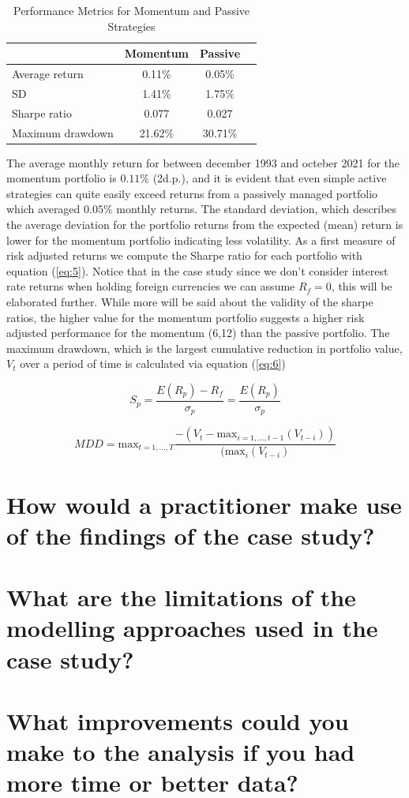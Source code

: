 \documentclass{article}
\begin{document}
\begin{table}
    \centering
    
    \caption{Performance Metrics for Momentum and Passive Strategies}
    \label{table:performance}
    \begin{tabular}{lccc}
        \toprule
        & \textbf{Momentum} & \textbf{Passive} \\
        \midrule
        Average return & 0.11\% & 0.05\% \\
        SD & 1.41\% & 1.75\% \\
        Sharpe ratio & 0.077 & 0.027 \\
        Maximum drawdown & 21.62\% & 30.71\% \\
        \bottomrule
    \end{tabular}
\end{table}

The average monthly return for between december 1993 and octeber 2021 for the momentum portfolio is $0.11\%$ (2d.p.), and it is evident that even simple active strategies can quite easily exceed returns from a passively managed portfolio which averaged $0.05\%$ monthly returns. The standard deviation, which describes the average deviation for the portfolio returns from the expected (mean) return is lower for the momentum portfolio indicating less volatility. As a first measure of risk adjusted returns we compute the Sharpe ratio for each portfolio with equation (\ref{eq:5}). Notice that in the case study since we don't consider interest rate returns when holding foreign currencies we can assume $R_{f} = 0$, this will be elaborated further.  While more will be said about the validity of the sharpe ratios, the higher value for the momentum portfolio suggests a higher risk adjusted performance for the momentum (6,12) than the passive portfolio. The maximum drawdown, which is the largest cumulative reduction in portfolio value, $V_{t}$ over a period of time is calculated via equation (\ref{eq:6})

\begin{equation}\label{eq:5}
    S_{p}=\frac{E(R_{p})-R_{f}}{\sigma_{p}}=\frac{E(R_{p})}{\sigma_{p}}
\end{equation}

\begin{equation}\label{eq:6}
        MDD = \text{max}_{t=1,...,T}\frac{-(V_{t}-\text{max}_{i=1,...,t-1}(V_{t-i}))}{(\text{max}_{i}(V_{t-i})}
\end{equation}


\newpage\section*{How would a practitioner make use of the findings of the case study?}

\newpage\section*{What are the limitations of the modelling approaches used in the case study?}

\newpage\section*{What improvements could you make	to the	analysis if	you	had	more time or better data?}

 

\end{document}
